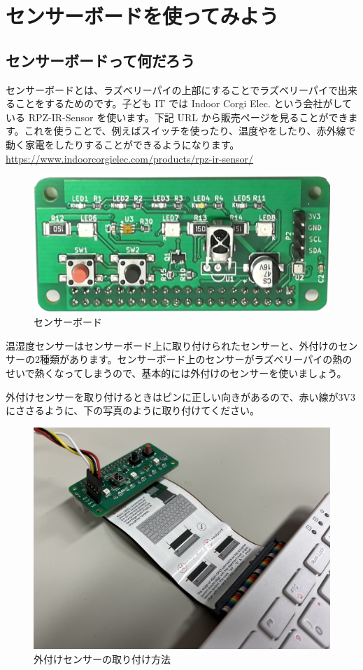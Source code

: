 \section{センサーボードを使ってみよう}
\subsection{センサーボードって何だろう}

センサーボードとは、ラズベリーパイの上部にすることでラズベリーパイで出来ることをするためのです。子ども IT では Indoor Corgi Elec. という会社がしている RPZ-IR-Sensor を使います。下記 URL から販売ページを見ることができます。これを使うことで、例えばスイッチを使ったり、温度やをしたり、赤外線で動く家電をしたりすることができるようになります。\\
\url{https://www.indoorcorgielec.com/products/rpz-ir-sensor/}\\

\begin{figure}[H]
    \centering
    \includegraphics[width=0.6\linewidth]{images/chap03/text03-img030.png}
    \caption{センサーボード}
\end{figure}

温湿度センサーはセンサーボード上に取り付けられたセンサーと、外付けのセンサーの2種類があります。センサーボード上のセンサーがラズベリーパイの熱のせいで熱くなってしまうので、基本的には外付けのセンサーを使いましょう。

外付けセンサーを取り付けるときはピンに正しい向きがあるので、赤い線が3V3にささるように、下の写真のように取り付けてください。

\begin{figure}[H]
    \centering
    \includegraphics[width=0.6\linewidth]{images/chap03/how_to_install_bme280.jpg}
    \caption{外付けセンサーの取り付け方法}
\end{figure}

